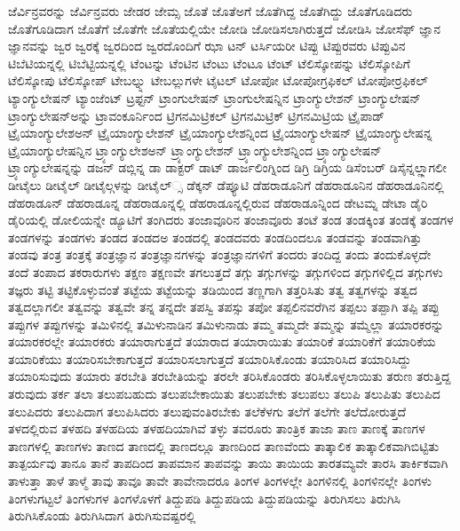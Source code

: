 {ಜೆರ್ವಿನ್ರವರನ್ನು
ಜೆರ್ವಿನ್ರವರು
ಜೇಡರ
ಜೇಮ್ಸ
ಜೊತೆ
ಜೊತೆಅಗೆ
ಜೊತೆಗಿದ್ದ
ಜೊತೆಗಿದ್ದು
ಜೊತೆಗೂಡಿದರು
ಜೊತೆಗೂಡಿದಾಗ
ಜೊತೆಗೆ
ಜೊತೆಗೇ
ಜೊತೆಯಲ್ಲಿಯೇ
ಜೋಡಿ
ಜೋಡಿಸಲಾಗಿರುತ್ತದೆ
ಜೋಡಿಸಿ
ಜೋಸೆಫ್
ಜ್ಞಾನ
ಜ್ಞಾನವನ್ನು
ಜ್ವರ
ಜ್ವರಕ್ಕೆ
ಜ್ವರದಿಂದ
ಜ್ವರದೊಂದಿಗೆ
ಝಾ
ಟನ್
ಟರ್ಸಿಯರೀ
ಟಿಪ್ಪು
ಟಿಪ್ಪುರವರು
ಟಿಪ್ಪುವಿನ
ಟಿಬೆಟಿಯನ್ನಲ್ಲಿ
ಟಿಬೆಟ್ಟಿಯನ್ನಲ್ಲಿ
ಟೆಂಟನ್ನು
ಟೆಂಟಿನ
ಟೆಂಟು
ಟೆಂಟೂ
ಟೆಂಟ್
ಟೆಲಿಸ್ಕೋಪನ್ನು
ಟೆಲಿಸ್ಕೋಪಿಗೆ
ಟೆಲಿಸ್ಕೋಪು
ಟೆಲಿಸ್ಕೋಪ್
ಟೇಬಲ್ನ್ನು
ಟೇಬಲ್ಲುಗಳೇ
ಟೈಟಲ್
ಟೋಪೋ
ಟೋಪೋಗ್ರಫಿಕಲ್
ಟೋಪೋರ್ರಫಿಕಲ್
ಟ್ಯಾಂಗ್ಯುಲೇಷನ್
ಟ್ಯಾಂಜೆಂಟ್
ಟ್ರಫ್ಟನ್
ಟ್ರಾಂಗುಲೇಷನ್
ಟ್ರಾಂಗುಲೇಷನ್ನಿನ
ಟ್ರಾಂಗ್ಯುಲೇಶನ್
ಟ್ರಾಂಗ್ಯುಲೇಷನ್
ಟ್ರಾಂಗ್ಯುಲೇಷನ್ಅನ್ನು
ಟ್ರಾವಂಕೂರ್ನಿಂದ
ಟ್ರಿಗನಮಿಟ್ರಿಕಲ್
ಟ್ರಿಗನಮಿಟ್ರಿಕ್
ಟ್ರಿಗನಮಿಟ್ರಿಯ
ಟ್ರೈಪಾಡ್
ಟ್ರೈಯಾಂಗ್ಯುಲೇಶಅನ್
ಟ್ರೈಯಾಂಗ್ಯುಲೇಶನ್
ಟ್ರೈಯಾಂಗ್ಯುಲೇಶನ್ನಿಂದ
ಟ್ರೈಯಾಂಗ್ಯುಲೇಷನ್
ಟ್ರೈಯಾಂಗ್ಯುಲೇಷನ್ನ
ಟ್ರೈಯಾಂಗ್ಯುಲೇಷನ್ನಿನ
ಟ್ರ್ಯಾಂಗ್ಯುಲೇಶಅನ್
ಟ್ರ್ಯಾಂಗ್ಯುಲೇಶನ್
ಟ್ರ್ಯಾಂಗ್ಯುಲೇಶನ್ನಿಂದ
ಟ್ರ್ಯಾಂಗ್ಯುಲೇಷನ್
ಟ್ರ್ಯಾಂಗ್ಯುಲೇಷನ್ನನ್ನು
ಡಜನ್
ಡಬ್ಲಿನ್ನ
ಡಾ
ಡಾಕ್ಟರ್
ಡಾಟ್
ಡಾರ್ಜಲಿಂಗ್ನಿಂದ
ಡಿಗ್ರಿ
ಡಿಗ್ರಿಯ
ಡಿಸೆಂಬರ್
ಡಿಸೈನ್ನಲ್ಲ್ಲಾಗಲೀ
ಡೀಟೈಲು
ಡೀಟೈಲ್
ಡೀಟೈಲ್ಗಳನ್ನು
ಡೀಟೈಲ್್ಸ
ಡೆಕ್ಕನ್
ಡೆಪ್ಯೂಟಿ
ಡೆಹರಾಡೂನಿಗೆ
ಡೆಹರಾಡೂನಿನ
ಡೆಹರಾಡೂನಿನಲ್ಲಿ
ಡೆಹರಾಡೂನ್
ಡೆಹರಾಡೂನ್ನ
ಡೆಹರಾಡೂನ್ನಲ್ಲಿ
ಡೆಹರಾಡೂನ್ನಲ್ಲಿರುವ
ಡೆಹರಾಡೂನ್ನಿಂದ
ಡೇಟಮ್ನ
ಡೇಟಾ
ಡೈರಿ
ಡೈರಿಯಲ್ಲಿ
ಡೋಲಿಯನ್ನೇ
ಡ್ಯೂಟಿಗೆ
ತಂಗಿದರು
ತಂಜಾವೂರಿನ
ತಂಜಾವೂರು
ತಂಟೆ
ತಂಡ
ತಂಡಕ್ಕಿಂತ
ತಂಡಕ್ಕೆ
ತಂಡಗಳ
ತಂಡಗಳನ್ನು
ತಂಡಗಳು
ತಂಡದ
ತಂಡದಅ
ತಂಡದಲ್ಲಿ
ತಂಡದವರು
ತಂಡದಿಂದಲೂ
ತಂಡವನ್ನು
ತಂಡವಾಗಿತ್ತು
ತಂಡವು
ತಂತ್ರ
ತಂತ್ರಕ್ಕೆ
ತಂತ್ರಜ್ಞಾನ
ತಂತ್ರಜ್ಞಾನಗಳನ್ನು
ತಂತ್ರಜ್ಞಾನಗಳಿಗೆ
ತಂದರು
ತಂದಿದ್ದ
ತಂದು
ತಂದುಕೊಳ್ಳದೇ
ತಂದೆ
ತಂಪಾದ
ತಕರಾರುಗಳು
ತಕ್ಷಣ
ತಕ್ಷಣವೇ
ತಗಲುತ್ತದೆ
ತಗ್ಗು
ತಗ್ಗುಗಳನ್ನು
ತಗ್ಗುಗಳಿಂದ
ತಗ್ಗುಗಳಿಲ್ಲಿದ
ತಗ್ಗುಗಳು
ತಜ್ಞರು
ತಟ್ಟಿ
ತಟ್ಟಿಕೊಳ್ಳುವಂತೆ
ತಟ್ಟೆಯ
ತಟ್ಟೆಯನ್ನು
ತಡಿಯಿಂದ
ತಣ್ಣಗಾಗಿ
ತತ್ತರಿಸಿತು
ತತ್ವ
ತತ್ವಗಳನ್ನು
ತತ್ವದ
ತತ್ವದಲ್ಲಾಗಲೀ
ತತ್ವವನ್ನು
ತತ್ವವೇ
ತನ್ನ
ತನ್ನದೇ
ತಪಸ್ವಿ
ತಪಸ್ಸು
ತಪೋ
ತಪ್ಪಲಿನವರೆಗಿನ
ತಪ್ಪಲು
ತಪ್ಪಾಗಿ
ತಪ್ಪಿ
ತಪ್ಪು
ತಪ್ಪುಗಳ
ತಪ್ಪುಗಳನ್ನು
ತಮಿಳಿನಲ್ಲಿ
ತಮಿಳುನಾಡಿನ
ತಮಿಳುನಾಡು
ತಮ್ಮ
ತಮ್ಮದೇ
ತಮ್ಮನ್ನು
ತಮ್ಮೆಲ್ಲಾ
ತಯಾರಕರನ್ನು
ತಯಾರಕರಲ್ಲೇ
ತಯಾರಕರು
ತಯಾರಾಗುತ್ತದೆ
ತಯಾರಾದ
ತಯಾರಾಯಿತು
ತಯಾರಿಕೆ
ತಯಾರಿಕೆಗೆ
ತಯಾರಿಕೆಯ
ತಯಾರಿಕೆಯು
ತಯಾರಿಸಬೇಕಾಗುತ್ತದೆ
ತಯಾರಿಸಲಾಗುತ್ತದೆ
ತಯಾರಿಸಿಕೊಂಡು
ತಯಾರಿಸಿದ
ತಯಾರಿಸಿದ್ದು
ತಯಾರಿಸುವುದು
ತಯಾರು
ತರಬೇತಿ
ತರಬೇತಿಯನ್ನು
ತರಲೇ
ತರಿಸಿಕೊಂಡರು
ತರಿಸಿಕೊಳ್ಳಲಾಯಿತು
ತರುಣ
ತರುತ್ತಿದ್ದ
ತರುವುದು
ತರ್ಕ
ತಲಾ
ತಲುಪಬಹುದು
ತಲುಪಬೇಕಾಯಿತು
ತಲುಪಬೇಕು
ತಲುಪಲು
ತಲುಪಿ
ತಲುಪಿತು
ತಲುಪಿದ
ತಲುಪಿದರು
ತಲುಪಿದಾಗ
ತಲುಪಿಸಿದರು
ತಲುಪುವಂತಿರಬೇಕು
ತಲೆಕೆಳಗು
ತಲೆಗೆ
ತಲೆಗೇ
ತಲೆದೋರುತ್ತದೆ
ತಳದಲ್ಲಿರುವ
ತಳಹದಿ
ತಳಹದಿಯ
ತಳಹದಿಯಾಗಿವೆ
ತಳ್ಳು
ತವರೂರು
ತಾಂತ್ರಿಕ
ತಾಜಾ
ತಾಣ
ತಾಣಕ್ಕೆ
ತಾಣಗಳ
ತಾಣಗಳಲ್ಲಿ
ತಾಣಗಳು
ತಾಣದ
ತಾಣದಲ್ಲಿ
ತಾಣದಲ್ಲೂ
ತಾಣದಿಂದ
ತಾಣವೆಂದು
ತಾತ್ಕಾಲಿಕ
ತಾತ್ಕಾಲಿಕವಾಗಿಬಿಟ್ಟಿತು
ತಾತ್ಪರ್ಯವು
ತಾನೂ
ತಾನೆ
ತಾಪದಿಂದ
ತಾಪಮಾನ
ತಾಪವನ್ನು
ತಾಯಿ
ತಾಯಿಯ
ತಾರತಮ್ಯವೇ
ತಾರಸಿ
ತಾರ್ಕಿಕವಾಗಿ
ತಾಳುತ್ತಾ
ತಾಳೆ
ತಾಳ್ಮೆ
ತಾವು
ತಾವೂ
ತಾವೇ
ತಾವೇನಾದರೂ
ತಿಂಗಳ
ತಿಂಗಳಲ್ಲೇ
ತಿಂಗಳಿನಲ್ಲಿ
ತಿಂಗಳಿನಲ್ಲೇ
ತಿಂಗಳು
ತಿಂಗಳುಗಟ್ಟಲೆ
ತಿಂಗಳುಗಳ
ತಿಂಗಳೊಳಗೆ
ತಿದ್ದುಪಡಿ
ತಿದ್ದುಪಡಿಯ
ತಿದ್ದುಪಡಿಯನ್ನು
ತಿರುಗಿಸಲು
ತಿರುಗಿಸಿ
ತಿರುಗಿಸಿಕೊಂಡು
ತಿರುಗಿಸಿದಾಗ
ತಿರುಗಿಸುವಷ್ಟರಲ್ಲಿ
}

